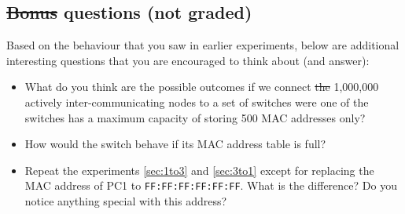 \documentclass[pdftex,12pt,a4paper]{article}
\providecommand{\DIFadd}[1]{{\protect\color{blue}\uwave{#1}}} %
\providecommand{\DIFdel}[1]{{\protect\color{red}\sout{#1}}}                      %
\providecommand{\DIFaddbegin}{} %
\providecommand{\DIFaddend}{} %
\providecommand{\DIFdelbegin}{} %
\providecommand{\DIFdelend}{} %
\begin{document}
        \subsection{\DIFdelbegin \DIFdel{Bonus }\DIFdelend \DIFaddbegin \DIFadd{Extra }\DIFaddend questions (not graded)}
            Based on the behaviour that you saw in earlier experiments, below
            are additional interesting questions that you are encouraged to
            think about (and answer):
            \begin{itemize}
                \item What do you think are the possible outcomes if we connect
                \DIFdelbegin \DIFdel{the }\DIFdelend 1,000,000 actively inter-communicating nodes to a set of
                \DIFaddbegin \DIFadd{daisy-chained }\DIFaddend switches were one of the switches has a
                maximum capacity of storing 500 MAC addresses only?
                \item How would the switch behave if its MAC address table is
                full?
                \item Repeat the experiments \ref{sec:1to3} and \ref{sec:3to1}
                except for replacing the MAC address of PC1 to
                \texttt{FF:FF:FF:FF:FF:FF}. What is the difference? Do you
                notice anything special with this address?
            \end{itemize}
\end{document}
